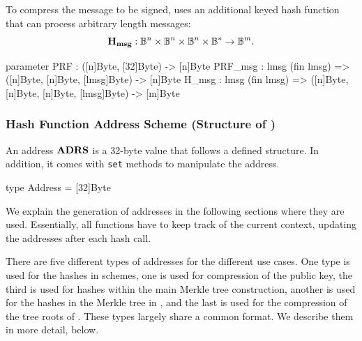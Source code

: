    To compress the message to be signed, \spx uses an additional keyed 
   hash function \sphincsHmsg that can process arbitrary length messages:
   \begin{equation*}
     \mathbf{H_{msg}}: \mathbb{B}^n\times\mathbb{B}^n\times\mathbb{B}^n \times \mathbb{B}^{*} \to \mathbb{B}^m.
   \end{equation*}   

\begin{code}
  parameter
    PRF : ([n]Byte, [32]Byte) -> [n]Byte
    PRF_msg : {lmsg} (fin lmsg) => ([n]Byte, [n]Byte, [lmsg]Byte) -> [n]Byte
    H_msg : {lmsg} (fin lmsg) =>
      ([n]Byte, [n]Byte, [n]Byte, [lmsg]Byte) -> [m]Byte
\end{code}

\subsubsection{Hash Function Address Scheme (Structure of \adrs)}\label{prelim:addresses}

   An address $\textbf{ADRS}$ is a 32-byte value that follows a defined structure.
   In addition, it comes with \texttt{set} methods to manipulate the address.  

\begin{code}
  type Address = [32]Byte
\end{code}

   We explain the generation of addresses in the following sections where they 
   are used. Essentially, all functions have to keep track of the current 
   context, updating the addresses after each hash call.

   There are five different types of addresses for the different use
   cases.  One type is used for the hashes in \wotsp schemes, one is used
   for compression of the \wotsp public key, the third is used for
   hashes within the main Merkle tree construction, another is used for 
   the hashes in the Merkle tree in \fors, and the last is used for the 
   compression of the tree roots of \fors. These types largely share a
   common format. We describe them in more detail, below.

